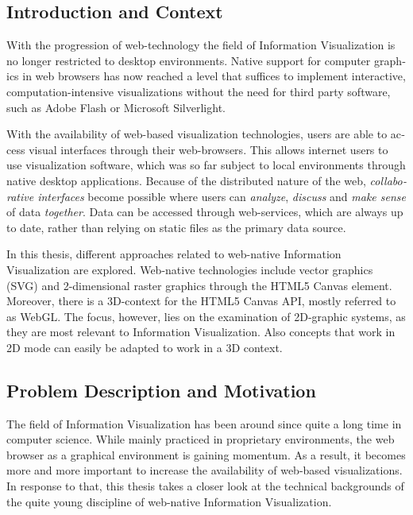 \begin{english}
\chapter{Introduction and Context}
\label{cha:introduction}

With the progression of web-technology the field of Information Visualization is no longer restricted to desktop environments. Native support for computer graphics in web browsers has now reached a level that suffices to implement interactive, computation-intensive visualizations without the need for third party software, such as Adobe Flash or Microsoft Silverlight.

With the availability of web-based visualization technologies, users are able to access visual interfaces through their web-browsers. This allows internet users to use visualization software, which was so far subject to local environments through native desktop applications. Because of the distributed nature of the web, \emph{collaborative interfaces} become possible where users can \emph{analyze}, \emph{discuss} and \emph{make sense} of data \emph{together}. Data can be accessed through web-services, which are always up to date, rather than relying on static files as the primary data source.

In this thesis, different approaches related to web-native Information Visualization are explored. Web-native technologies include vector graphics (SVG) and 2-dimensional raster graphics through the HTML5 Canvas element. Moreover, there is a 3D-context for the HTML5 Canvas API, mostly referred to as WebGL. The focus, however, lies on the examination of 2D-graphic systems, as they are most relevant to Information Visualization. Also concepts that work in 2D mode can easily be adapted to work in a 3D context.


\section{Problem Description and Motivation}

The field of Information Visualization has been around since quite a long time in computer science. While mainly practiced in proprietary environments, the web browser as a graphical environment is gaining momentum. As a result, it becomes more and more important to increase the availability of web-based visualizations. In response to that, this thesis takes a closer look at the technical backgrounds of the quite young discipline of web-native Information Visualization.


\end{english}
